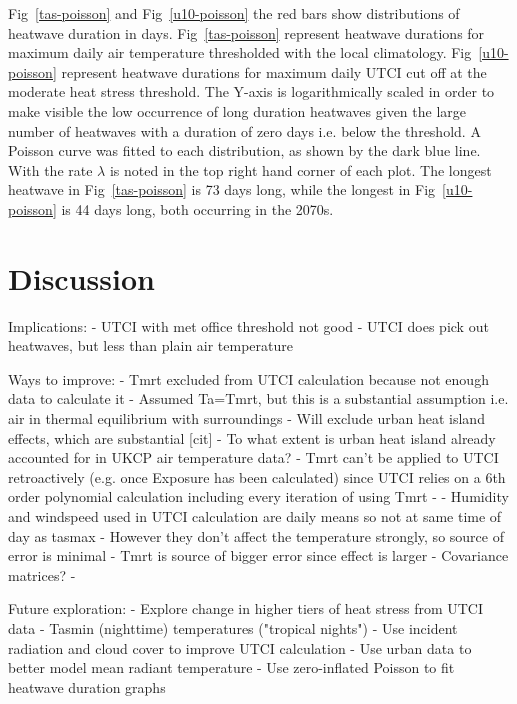 \documentclass[10pt,letterpaper]{article}
\begin{document}
Fig~\ref{tas-poisson} and Fig~\ref{u10-poisson} the red bars show distributions of heatwave duration in days.
Fig~\ref{tas-poisson} represent heatwave durations for maximum daily air temperature thresholded with the local climatology.
Fig~\ref{u10-poisson} represent heatwave durations for maximum daily UTCI cut off at the moderate heat stress threshold.
The Y-axis is logarithmically scaled in order to make visible the low occurrence of long duration heatwaves given the large number of heatwaves with a duration of zero days i.e. below the threshold.
A Poisson curve was fitted to each distribution, as shown by the dark blue line.
With the rate $\lambda$ is noted in the top right hand corner of each plot.
The longest heatwave in Fig~\ref{tas-poisson} is 73 days long, while the longest in Fig~\ref{u10-poisson} is 44 days long, both occurring in the 2070s.



\section*{Discussion}

Implications:
- UTCI with met office threshold not good
- UTCI does pick out heatwaves, but less than plain air temperature

Ways to improve:
- Tmrt excluded from UTCI calculation because not enough data to calculate it
    - Assumed Ta=Tmrt, but this is a substantial assumption i.e. air in thermal equilibrium with surroundings
    - Will exclude urban heat island effects, which are substantial [cit]
    - To what extent is urban heat island already accounted for in UKCP air temperature data?
    - Tmrt can't be applied to UTCI retroactively (e.g. once Exposure has been calculated) since UTCI relies on a 6th order polynomial calculation including every iteration of using Tmrt
    - \cite{Weihs2018}
- Humidity and windspeed used in UTCI calculation are daily means so not at same time of day as tasmax
    - However they don't affect the temperature strongly, so source of error is minimal
    - Tmrt is source of bigger error since effect is larger
    - Covariance matrices?
- 

Future exploration:
- Explore change in higher tiers of heat stress from UTCI data
- Tasmin (nighttime) temperatures ("tropical nights")
- Use incident radiation and cloud cover to improve UTCI calculation
- Use urban data to better model mean radiant temperature
- Use zero-inflated Poisson to fit heatwave duration graphs
\end{document}
